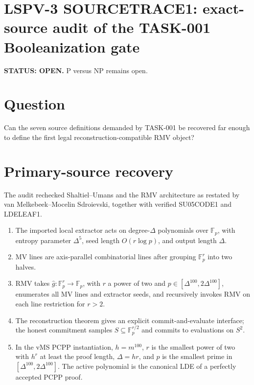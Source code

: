 \documentclass[11pt]{article}
\begin{document}
\section*{LSPV-3 SOURCETRACE1: exact-source audit of the TASK-001 Booleanization gate}
\textbf{STATUS: OPEN.} P versus NP remains open.
\section*{Question}
Can the seven source definitions demanded by TASK-001 be recovered far enough to define the first legal reconstruction-compatible RMV object?
\section*{Primary-source recovery}
The audit rechecked Shaltiel--Umans and the RMV architecture as restated by van Melkebeek--Mocelin Sdroievski, together with verified SU05CODE1 and LDELEAF1.
\begin{enumerate}
\item The imported local extractor acts on degree-$\Delta$ polynomials over $\mathbb F_p$, with entropy parameter $\Delta^5$, seed length $O(r\log p)$, and output length $\Delta$.
\item MV lines are axis-parallel combinatorial lines after grouping $\mathbb F_p^r$ into two halves.
\item RMV takes $\widehat g:\mathbb F_p^r\to\mathbb F_p$, with $r$ a power of two and $p\in[\Delta^{100},2\Delta^{100}]$, enumerates all MV lines and extractor seeds, and recursively invokes RMV on each line restriction for $r>2$.
\item The reconstruction theorem gives an explicit commit-and-evaluate interface; the honest commitment samples $S\subseteq\mathbb F_p^{r/2}$ and commits to evaluations on $S^2$.
\item In the vMS PCPP instantiation, $h=m^{100}$, $r$ is the smallest power of two with $h^r$ at least the proof length, $\Delta=hr$, and $p$ is the smallest prime in $[\Delta^{100},2\Delta^{100}]$. The active polynomial is the canonical LDE of a perfectly accepted PCPP proof.
\end{enumerate}
\end{document}
